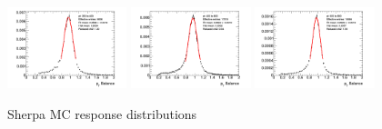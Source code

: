 \begin{figure}[htb!]
    \includegraphics[width=0.31\textwidth]{plots/insitu/fits_sherpa_zee_nominal/Zeejet_Nominal_Bin8.png}
    \includegraphics[width=0.31\textwidth]{plots/insitu/fits_sherpa_zee_nominal/Zeejet_Nominal_Bin9.png}
    \includegraphics[width=0.31\textwidth]{plots/insitu/fits_sherpa_zee_nominal/Zeejet_Nominal_Bin10.png}
    \caption{Sherpa MC \zeejet response distributions \label{fig:App:zeesherpafits}}
\end{figure}

